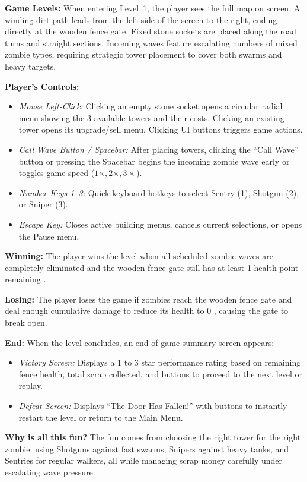 \textbf{Game Levels:} When entering Level~1, the player sees the full map on screen. A winding dirt path leads from the left side of the screen to the right, ending directly at the wooden fence gate. Fixed stone sockets are placed along the road turns and straight sections. Incoming waves feature escalating numbers of mixed zombie types, requiring strategic tower placement to cover both swarms and heavy targets.

\textbf{Player's Controls:}
\begin{itemize}[label=\textbullet]
  \item \textit{Mouse Left-Click:} Clicking an empty stone socket opens a circular radial menu showing the 3 available towers and their costs. Clicking an existing tower opens its upgrade/sell menu. Clicking UI buttons triggers game actions.
  \item \textit{Call Wave Button / Spacebar:} After placing towers, clicking the ``Call Wave'' button or pressing the Spacebar begins the incoming zombie wave early or toggles game speed ($1\times, 2\times, 3\times$).
  \item \textit{Number Keys 1--3:} Quick keyboard hotkeys to select Sentry (1), Shotgun (2), or Sniper (3).
  \item \textit{Escape Key:} Closes active building menus, cancels current selections, or opens the Pause menu.
\end{itemize}

\textbf{Winning:} The player wins the level when all scheduled zombie waves are completely eliminated and the wooden fence gate still has at least 1 health point remaining .

\textbf{Losing:} The player loses the game if zombies reach the wooden fence gate and deal enough cumulative damage to reduce its health to 0 , causing the gate to break open.

\textbf{End:} When the level concludes, an end-of-game summary screen appears:
\begin{itemize}[label=\textbullet]
  \item \textit{Victory Screen:} Displays a 1 to 3 star performance rating based on remaining fence health, total scrap collected, and buttons to proceed to the next level or replay.
  \item \textit{Defeat Screen:} Displays ``The Door Has Fallen!'' with buttons to instantly restart the level or return to the Main Menu.
\end{itemize}

\textbf{Why is all this fun?} The fun comes from choosing the right tower for the right zombie: using Shotguns against fast swarms, Snipers against heavy tanks, and Sentries for regular walkers, all while managing scrap money carefully under escalating wave pressure.

